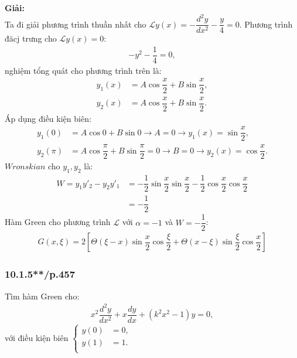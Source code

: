\documentclass{report}
\newcommand{\f}[2]{\dfrac{#1}{#2}}
\begin{document}
\textbf{Giải:}\\
Ta đi giải phương trình thuần nhất cho $\mathcal{L} y(x) = -\dfrac{d^2 y}{dx^2} - \dfrac{y}{4}  = 0$. Phương trình đăcj trưng cho $\mathcal{L} y(x) = 0:$
\begin{align*}
	-y^2 - \dfrac{1}{4} = 0,
\end{align*}
nghiệm tổng quát cho phương trình trên là:
\begin{align*}
	y_{1}(x) & = A \cos \f{x}{2} + B \sin \f{x}{2}, \\
	y_{2}(x) & = A \cos \f{x}{2} + B \sin \f{x}{2}.
\end{align*}
Áp dụng điều kiện biên:
\begin{align*}
	y_{1}(0)   & = A \cos 0 + B \sin 0 \rightarrow A = 0 \rightarrow y_{1}(x) = \sin \f{x}{2},                     \\
	y_{2}(\pi) & = A \cos \f{\pi}{2} + B \sin \f{\pi}{2} = 0 \rightarrow B = 0 \rightarrow y_2(x) = \cos \f{x}{2}.
\end{align*}
$Wronskian$ cho $y_1,y_2$ là:
\begin{align*}
	W = y_1 y'_2 - y_2 y'_1
	 & = -\f{1}{2} \sin \f{x}{2} \sin \f{x}{2} - \f{1}{2} \cos \f{x}{2} \cos \f{x}{2} \\
	 & = -\f{1}{2}
\end{align*}
Hàm Green cho phương trình $\mathcal{L}$ với $\alpha = - 1$ và $ W = -\f{1}{2}$:
\begin{align*}
	G(x,\xi) = 2 \left[ \Theta(\xi - x) \sin \f{x}{2} \cos \f{\xi}{2} + \Theta(x-\xi) \sin \f{\xi}{2} \cos \f{x}{2} \right]
\end{align*}
\subsubsection{10.1.5**/p.457}
Tìm hàm Green cho:
\begin{align*}
	x^2 \f{d^2y}{dx^2} + x \f{dy}{dx} + \left(k^2 x^2 - 1\right)y = 0,
\end{align*}
với điều kiện biên
$
	\begin{cases}
		y(0) & = 0, \\
		y(1) & = 1. \\
	\end{cases}
$\\
\end{document}
